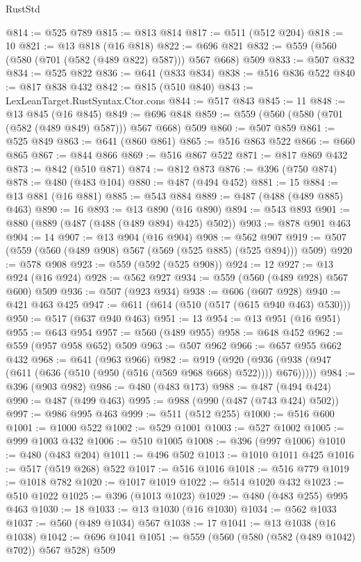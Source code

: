 \begin{lexlean}{RustStd}
\begin{coremodule}
@814 := @525 @789
@815 := @813 @814
@817 := @511 (@512 @204)
@818 := 10
@821 := @13 @818 (@16 @818)
@822 := @696 @821
@832 := @559 (@560 (@580 (@701 (@582 (@489 @822) @587))) @567 @668) @509
@833 := @507 @832
@834 := @525 @822
@836 := @641 (@833 @834)
@838 := @516 @836 @522
@840 := @817 @838 @432
@842 := @815 (@510 @840)
@843 := LexLeanTarget.RustSyntax.Ctor.cons
@844 := @517 @843
@845 := 11
@848 := @13 @845 (@16 @845)
@849 := @696 @848
@859 := @559 (@560 (@580 (@701 (@582 (@489 @849) @587))) @567 @668) @509
@860 := @507 @859
@861 := @525 @849
@863 := @641 (@860 @861)
@865 := @516 @863 @522
@866 := @660 @865
@867 := @844 @866
@869 := @516 @867 @522
@871 := @817 @869 @432
@873 := @842 (@510 @871)
@874 := @812 @873
@876 := @396 (@750 @874)
@878 := @480 (@483 @104)
@880 := @487 (@494 @452)
@881 := 15
@884 := @13 @881 (@16 @881)
@885 := @543 @884
@889 := @487 (@488 (@489 @885) @463)
@890 := 16
@893 := @13 @890 (@16 @890)
@894 := @543 @893
@901 := @880 (@889 (@487 (@488 (@489 @894) @425) @502))
@903 := @878 @901 @463
@904 := 14
@907 := @13 @904 (@16 @904)
@908 := @562 @907
@919 := @507 (@559 (@560 (@489 @908) @567 (@569 (@525 @885) (@525 @894))) @509)
@920 := @578 @908
@923 := @559 (@592 (@525 @908))
@924 := 12
@927 := @13 @924 (@16 @924)
@928 := @562 @927
@934 := @559 (@560 (@489 @928) @567 @600) @509
@936 := @507 (@923 @934)
@938 := @606 (@607 @928)
@940 := @421 @463 @425
@947 := @611 (@614 (@510 (@517 (@615 @940 @463) @530)))
@950 := @517 (@637 @940 @463)
@951 := 13
@954 := @13 @951 (@16 @951)
@955 := @643 @954
@957 := @560 (@489 @955)
@958 := @648 @452
@962 := @559 (@957 @958 @652) @509
@963 := @507 @962
@966 := @657 @955 @662 @432
@968 := @641 (@963 @966)
@982 := @919
    (@920 (@936 (@938 (@947 (@611 (@636 (@510 (@950 (@516 (@569 @968 @668) @522)))) @676)))))
@984 := @396 (@903 @982)
@986 := @480 (@483 @173)
@988 := @487 (@494 @424)
@990 := @487 (@499 @463)
@995 := @988 (@990 (@487 (@743 @424) @502))
@997 := @986 @995 @463
@999 := @511 (@512 @255)
@1000 := @516 @600
@1001 := @1000 @522
@1002 := @529 @1001
@1003 := @527 @1002
@1005 := @999 @1003 @432
@1006 := @510 @1005
@1008 := @396 (@997 @1006)
@1010 := @480 (@483 @204)
@1011 := @496 @502
@1013 := @1010 @1011 @425
@1016 := @517 (@519 @268) @522
@1017 := @516 @1016
@1018 := @516 @779
@1019 := @1018 @782
@1020 := @1017 @1019
@1022 := @514 @1020 @432
@1023 := @510 @1022
@1025 := @396 (@1013 @1023)
@1029 := @480 (@483 @255) @995 @463
@1030 := 18
@1033 := @13 @1030 (@16 @1030)
@1034 := @562 @1033
@1037 := @560 (@489 @1034) @567
@1038 := 17
@1041 := @13 @1038 (@16 @1038)
@1042 := @696 @1041
@1051 := @559 (@560 (@580 (@582 (@489 @1042) @702)) @567 @528) @509

\end{coremodule}
\end{lexlean}
